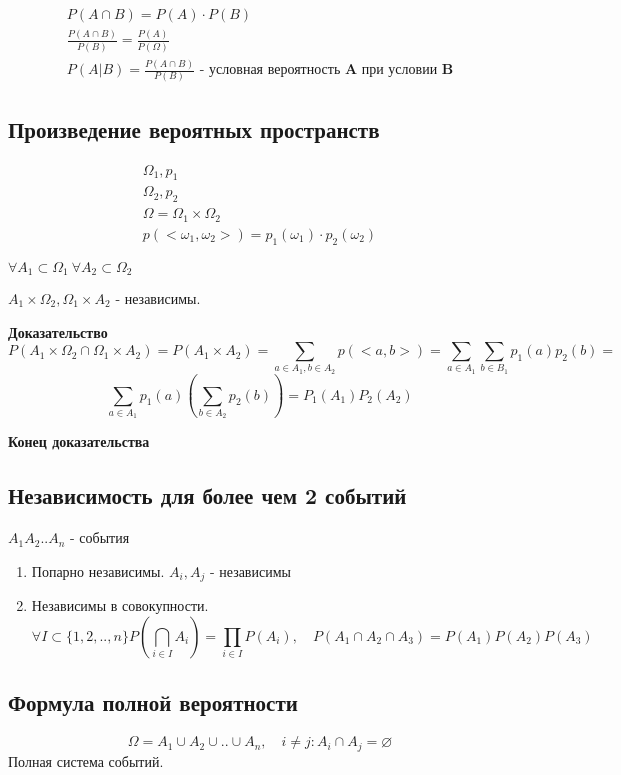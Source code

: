 \documentclass{article}
\begin{document}
	\begin{align*}
		P(A \cap B) = P(A) \cdot P(B) \\
		\frac{P(A \cap B)}{P(B)} = \frac{P(A)}{P(\Omega)} \\
		P(A|B) = \frac{P(A \cap B)}{P(B)} \textbf{ - условная вероятность A при условии B}
	\end{align*}
	
	\subsection{Произведение вероятных пространств}
	\begin{align*}
		\Omega_1, p_1 \\
		\Omega_2, p_2 \\
		\Omega = \Omega_1 \times \Omega_2 \\
		p(<\omega_1, \omega_2>) = p_1(\omega_1) \cdot p_2(\omega_2)
	\end{align*}
	
	\noindent $\forall A_1 \subset \Omega_1 \ \forall A_2 \subset \Omega_2$ 
	
	\noindent $A_1 \times \Omega_2, \Omega_1 \times A_2$ - независимы.
	
	{ \bf Доказательство }
	$$
		P(A_1 \times \Omega_2 \cap \Omega_1 \times A_2) = P(A_1 \times A_2) =
		\sum\limits_{a \in A_1, b \in A_2}p(<a, b>) =
		\sum\limits_{a \in A_1}\sum\limits_{b \in B_1}p_1(a)p_2(b) =
	$$
	$$
			\sum\limits_{a \in A_1}p_1(a)(\sum\limits_{b \in A_2}p_2(b)) =
		P_1(A_1)P_2(A_2)
	$$
	
	{ \bf Конец доказательства }

	\subsection{Независимость для более чем 2 событий}
	$A_1A_2..A_n$ - события
	
	\begin{enumerate}
		\item Попарно независимы. $A_i, A_j $ - независимы
		\item Независимы в совокупности. 
		$$
			\forall I \subset \{1, 2, .., n\} P(\bigcap\limits_{i \in I}A_i) = \prod\limits_{i \in I}P(A_i), \quad
			P(A_1 \cap A_2 \cap A_3) = P(A_1)P(A_2)P(A_3)
		$$
	\end{enumerate}
	
	\subsection{Формула полной вероятности}
	$$
		\Omega = A_1 \cup A_2 \cup .. \cup A_n, \quad i \neq j: A_i \cap A_j = \varnothing
	$$
	Полная система событий.
	
\end{document}

